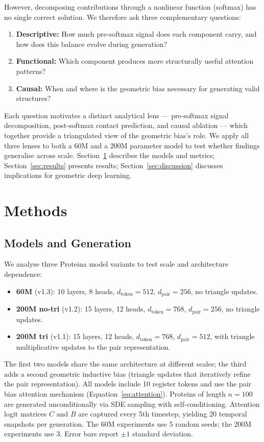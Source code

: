 \documentclass{article}
\begin{document}
However, decomposing contributions through a nonlinear function (softmax) has no single correct solution.
We therefore ask three complementary questions:
\begin{enumerate}
    \item \textbf{Descriptive:} How much pre-softmax signal does each component carry, and how does this balance evolve during generation?
    \item \textbf{Functional:} Which component produces more structurally useful attention patterns?
    \item \textbf{Causal:} When and where is the geometric bias necessary for generating valid structures?
\end{enumerate}
Each question motivates a distinct analytical lens --- pre-softmax signal decomposition, post-softmax contact prediction, and causal ablation --- which together provide a triangulated view of the geometric bias's role.
We apply all three lenses to both a 60M and a 200M parameter model to test whether findings generalise across scale.
Section~\ref{sec:methods} describes the models and metrics; Section~\ref{sec:results} presents results; Section~\ref{sec:discussion} discusses implications for geometric deep learning.

\section{Methods}
\label{sec:methods}

\subsection{Models and Generation}

We analyse three Proteina model variants to test scale and architecture dependence:
\begin{itemize}
    \item \textbf{60M} (v1.3): 10 layers, 8 heads, $d_\text{token}{=}512$, $d_\text{pair}{=}256$, no triangle updates.
    \item \textbf{200M no-tri} (v1.2): 15 layers, 12 heads, $d_\text{token}{=}768$, $d_\text{pair}{=}256$, no triangle updates.
    \item \textbf{200M tri} (v1.1): 15 layers, 12 heads, $d_\text{token}{=}768$, $d_\text{pair}{=}512$, with triangle multiplicative updates to the pair representation.
\end{itemize}
The first two models share the same architecture at different scales; the third adds a second geometric inductive bias (triangle updates that iteratively refine the pair representation).
All models include 10 register tokens and use the pair bias attention mechanism (Equation~\ref{eq:attention}).
Proteins of length $n{=}100$ are generated unconditionally via SDE sampling with self-conditioning.
Attention logit matrices $C$ and $B$ are captured every 5th timestep, yielding 20 temporal snapshots per generation.
The 60M experiments use 5 random seeds; the 200M experiments use 3. Error bars report $\pm 1$ standard deviation.
\end{document}
